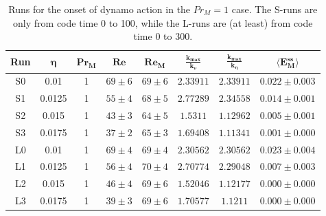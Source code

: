 \documentclass[12pt,a4paper]{report}
\begin{document}
\begin{table}[h]
\begin{center}
\begin{tabular}{||c|c|c|c|c|c|c|c||}
\hline
\textbf{Run} & $ \bm{\eta} $ & $ \bm{ Pr_M} $ & $ \bm{ Re} $ & $ \bm{ Re_M} $ & $ \bm{ \frac{k_{max}}{k_\nu}} $ & $ \bm{ \frac{k_{max}}{k_\eta}} $ & $ \bm{ \langle E_M^{ss}} \rangle $ \\ \hline \hline
S0 & 0.01 & 1 & $ 69 \pm 6 $ & $ 69 \pm 6 $ & $ 2.33911 $ & $ 2.33911 $ & $ 0.022 \pm 0.003 $ \\ \hline
S1 & 0.0125 & 1 & $ 55 \pm 4 $ & $ 68 \pm 5 $ & $ 2.77289 $ & $ 2.34558 $ & $ 0.014 \pm 0.001 $ \\ \hline
S2 & 0.015 & 1 & $ 43 \pm 3 $ & $ 64 \pm 5 $ & $ 1.5311 $ & $ 1.12962 $ & $ 0.005 \pm 0.001 $ \\ \hline
S3 & 0.0175 & 1 & $ 37 \pm 2 $ & $ 65 \pm 3 $ & $ 1.69408 $ & $ 1.11341 $ & $ 0.001 \pm 0.000 $ \\ \hline \hline
L0 & 0.01 & 1 & $ 69 \pm 4 $ & $ 69 \pm 4 $ & $ 2.30562 $ & $ 2.30562 $ & $ 0.023 \pm 0.004 $ \\ \hline
L1 & 0.0125 & 1 & $ 56 \pm 4 $ & $ 70 \pm 4 $ & $ 2.70774 $ & $ 2.29048 $ & $ 0.007 \pm 0.003 $ \\ \hline
L2 & 0.015 & 1 & $ 46 \pm 4 $ & $ 69 \pm 6 $ & $ 1.52046 $ & $ 1.12177 $ & $ 0.000 \pm 0.000 $ \\ \hline
L3 & 0.0175 & 1 & $ 39 \pm 3 $ & $ 69 \pm 6 $ & $ 1.70577 $ & $ 1.1211 $ & $ 0.000 \pm 0.000 $ \\ \hline
\end{tabular}
\end{center}
\caption{Runs for the onset of dynamo action in the $Pr_M=1$ case. The S-runs are only from code time 0 to 100, while the L-runs are (at least) from code time 0 to 300.}
\label{tableB1}
\end{table}




\end{document}
